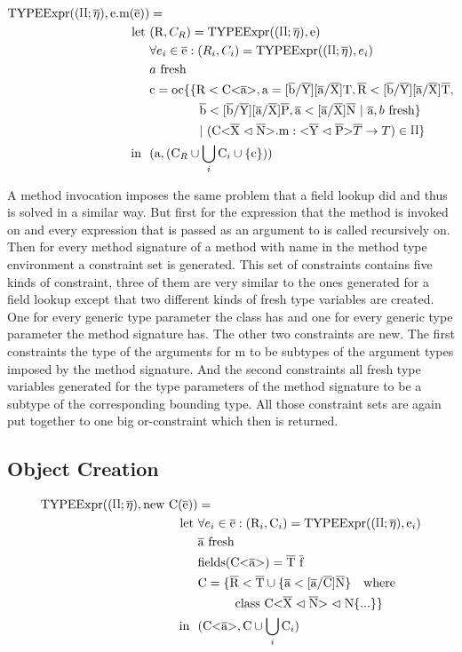\begin{align*}
    \texpr{\text{e.m}( \ot{e} )} &= \\
    \text{let} \ &( \text{R}, C_R ) = \texpr{\text{e}} \\
    &\forall{e_i} \in \ot{e} : ( R_i, C_i ) = \texpr{e_i} \\
    &\fresh{a} \\
    &\text{c} = \text{oc} \{ \{ \text{R} < \text{C<} \ot{a} \text{>}, \text{a} = \tsxsnd{b}{Y}{a}{X}{T}, \ot{R} < \tsxsnsd{b}{Y}{a}{X}{T}, \\
    & \quad \quad \quad \quad \ot{b} < \tsxsnsd{b}{Y}{a}{X}{P}, \ot{a} < \tsxsns{a}{X}{N} \ | \ \ot{a}, \fresh{b} \} \\
    & \quad \quad \quad \quad | \ ( \cm : \yp \oto{T} ) \in \sprod{0.7} \}\\
    \text{in} \ \ & (\text{a}, (\text{C}_R \cup \bigcup_{i} \text{C}_i \cup \{ \text{c} \} ))
\end{align*}

A method invocation imposes the same problem that a field lookup did and thus is solved in a similar way. But first for the
expression that the method  is invoked on and every expression that is passed as an argument to  
is called recursively on. Then for every method signature of a method with name  in the method type environment a constraint
set is generated. This set of constraints contains five kinds of constraint, three of them are very similar to the ones generated for a
field lookup except that two different kinds of fresh type variables are created. One for every generic type parameter the class has and
one for every generic type parameter the method signature has. The other two constraints are new. The first constraints the type of the arguments for m to be subtypes of the
argument types imposed by the method signature. And the second constraints all fresh type variables generated for the type parameters
of the method signature to be a subtype of the corresponding bounding type. All those constraint sets are again put together to one big or-constraint which then is returned.

\subsection{Object Creation}

\begin{align*}
    \texpr{\text{new} \ \text{C}(\ot{e})} &=\\
    \text{let} \ & \forall{e_i} \in \ot{e} : (\text{R}_i, \text{C}_i) = \texpr{\text{e}_i}\\
    & \fresh{\ot{a}}\\
    & \text{fields}(\nvt{C}{a}) = \ot{T} \ \ot{f}\\
    & \text{C} = \{ \ot{R} < \ot{T} \cup \{ \ot{a} < \tsxsns{a}{C}{N} \} \quad \text{where} \\
    & \quad \quad \quad \classheader \{ ... \} \}\\
    \text{in} \ \ & ( \nvt{C}{a}, \text{C} \cup \bigcup_{i} \text{C}_i )
\end{align*}

